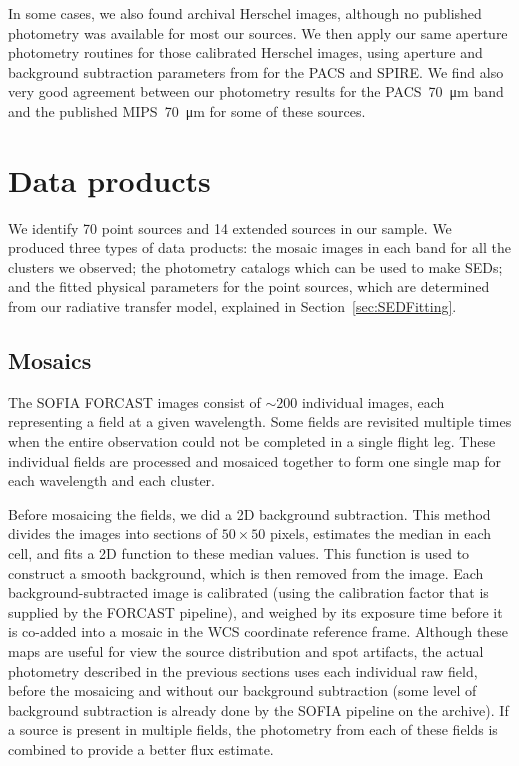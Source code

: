 In some cases, we also found archival Herschel images, although no published photometry was available for most our sources. We then apply our same aperture photometry routines for those calibrated Herschel images, using aperture and background subtraction parameters from \citet{Shimizu:2016if} for the PACS and SPIRE. We find also very good agreement between our photometry results for the PACS~\SI{70}{\um} band and the published \Spitzer MIPS~\SI{70}{\um} for some of these sources. %

\section{Data products}

We identify 70 point sources and 14 extended sources in our sample. We produced three types of data products: the mosaic images in each band for all the clusters we observed; the photometry catalogs which can be used to make SEDs; and the fitted physical parameters for the point sources, which are determined from our radiative transfer model, explained in Section~\ref{sec:SEDFitting}.

\subsection{Mosaics}
The SOFIA FORCAST images consist of $\sim 200$ individual images, each representing a field at a given wavelength. Some fields are revisited multiple times when the entire observation could not be completed in a single flight leg. These individual fields are processed and mosaiced together to form one single map for each wavelength and each cluster. 

Before mosaicing the fields, we did a 2D background subtraction. This method divides the images into sections of $50\times 50$ pixels, estimates the median in each cell, and fits a 2D function to these median values. This function is used to construct a smooth background, which is then removed from the image. Each background-subtracted image is calibrated (using the calibration factor that is supplied by the FORCAST pipeline), and weighed by its exposure time before it is co-added into a mosaic in the WCS coordinate reference frame. Although these maps are useful for view the source distribution and spot artifacts, the actual photometry described in the previous sections uses each individual raw field, before the mosaicing and without our background subtraction (some level of background subtraction is already done by the SOFIA pipeline on the archive). If a source is present in multiple fields, the photometry from each of these fields is combined to provide a better flux estimate.

